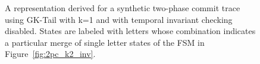 \begin{figure}[!t]
  \caption{A representation derived for a synthetic two-phase commit
    trace using GK-Tail with k=1 and with temporal invariant checking
    disabled. States are labeled with letters whose combination
    indicates a particular merge of single letter states of the FSM in
    Figure~\ref{fig:2pc_k2_inv}.}
\label{fig:2pc_k1_noinv}
\end{figure}

